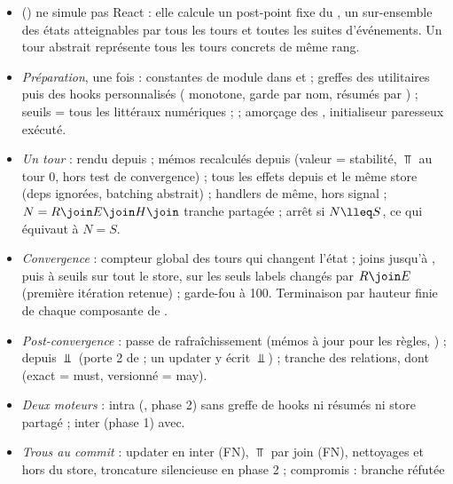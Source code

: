 \begin{resume}
\begin{itemize}
  \item {} () ne
    simule pas React : elle calcule un post-point fixe du ,
    un sur-ensemble des états atteignables par tous les tours et toutes les
    suites d'événements. Un tour abstrait représente tous les tours concrets
    de même rang.
  \item \emph{Préparation}, une fois : constantes de module dans
     et  ; greffes des utilitaires puis
    des hooks personnalisés ( monotone, garde par nom,
    résumés par ) ; seuils = tous les littéraux
    numériques ;  ; amorçage des ,
    initialiseur paresseux exécuté.
  \item \emph{Un tour} : rendu depuis  ; mémos recalculés
    depuis  (valeur = stabilité, $\Top$ au tour 0, hors test
    de convergence) ; tous les effets depuis  et le même
    store (deps ignorées, batching abstrait) ; handlers de même, hors
    signal ; $N = R \join E \join H \join$ tranche partagée ; arrêt si
    $N \lleq S$, ce qui équivaut à $N = S$.
  \item \emph{Convergence} : compteur global des tours qui changent l'état ;
    joins jusqu'à , puis  à seuils
    sur tout le store,  sur les seuls labels changés par
    $R \join E$ (première itération retenue) ; garde-fou à 100. Terminaison
    par hauteur finie de chaque composante de .
  \item \emph{Post-convergence} : passe de rafraîchissement (mémos à jour
    pour les règles, ) ; 
    depuis $\Bot$ (porte 2 de  ; un updater y écrit
    $\Bot$) ; tranche des relations, dont 
    (exact = must, versionné = may).
  \item \emph{Deux moteurs} : intra (, phase 2) sans
    greffe de hooks ni résumés ni store partagé ; inter (phase 1) avec.
  \item \emph{Trous au commit \snapshotCommit} : updater en inter (FN),
    $\Top$ par join (FN), nettoyages et  hors du store,
    troncature silencieuse en phase 2 ; compromis : branche réfutée

\end{itemize}
\end{resume}
